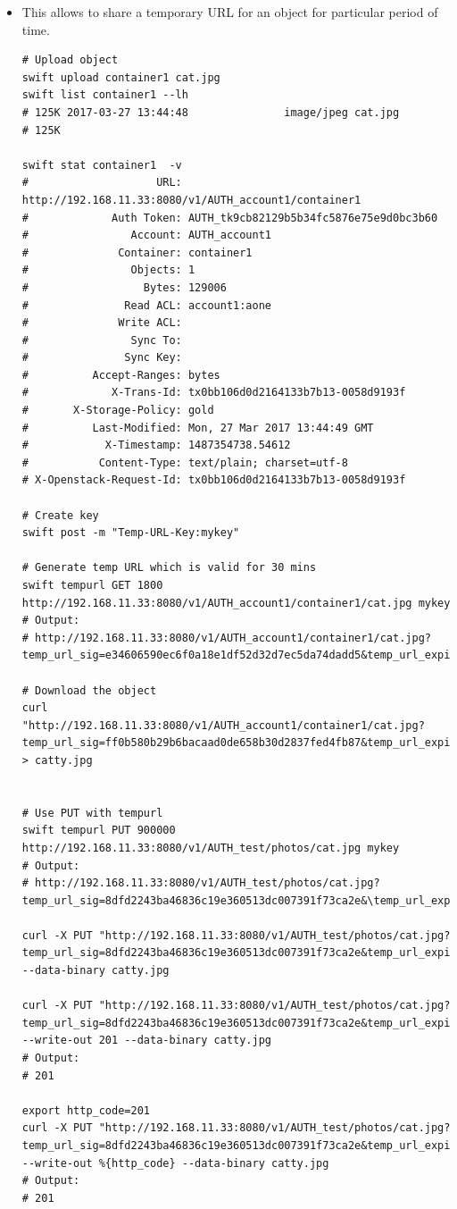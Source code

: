 \documentclass{article}
\begin{document}
\begin{itemize}
\item This allows to share a temporary URL for an object for particular
period of time.

\begin{verbatim}
# Upload object
swift upload container1 cat.jpg
swift list container1 --lh
# 125K 2017-03-27 13:44:48               image/jpeg cat.jpg
# 125K

swift stat container1  -v
#                    URL: http://192.168.11.33:8080/v1/AUTH_account1/container1
#             Auth Token: AUTH_tk9cb82129b5b34fc5876e75e9d0bc3b60
#                Account: AUTH_account1
#              Container: container1
#                Objects: 1
#                  Bytes: 129006
#               Read ACL: account1:aone
#              Write ACL:
#                Sync To:
#               Sync Key:
#          Accept-Ranges: bytes
#             X-Trans-Id: tx0bb106d0d2164133b7b13-0058d9193f
#       X-Storage-Policy: gold
#          Last-Modified: Mon, 27 Mar 2017 13:44:49 GMT
#            X-Timestamp: 1487354738.54612
#           Content-Type: text/plain; charset=utf-8
# X-Openstack-Request-Id: tx0bb106d0d2164133b7b13-0058d9193f

# Create key
swift post -m "Temp-URL-Key:mykey"

# Generate temp URL which is valid for 30 mins
swift tempurl GET 1800 http://192.168.11.33:8080/v1/AUTH_account1/container1/cat.jpg mykey
# Output:
# http://192.168.11.33:8080/v1/AUTH_account1/container1/cat.jpg?temp_url_sig=e34606590ec6f0a18e1df52d32d7ec5da74dadd5&temp_url_expires=1490624622

# Download the object
curl "http://192.168.11.33:8080/v1/AUTH_account1/container1/cat.jpg?temp_url_sig=ff0b580b29b6bacaad0de658b30d2837fed4fb87&temp_url_expires=1490624309" > catty.jpg


# Use PUT with tempurl
swift tempurl PUT 900000 http://192.168.11.33:8080/v1/AUTH_test/photos/cat.jpg mykey
# Output:
# http://192.168.11.33:8080/v1/AUTH_test/photos/cat.jpg?temp_url_sig=8dfd2243ba46836c19e360513dc007391f73ca2e&\temp_url_expires=1502741120

curl -X PUT "http://192.168.11.33:8080/v1/AUTH_test/photos/cat.jpg?temp_url_sig=8dfd2243ba46836c19e360513dc007391f73ca2e&temp_url_expires=1502741120" --data-binary catty.jpg

curl -X PUT "http://192.168.11.33:8080/v1/AUTH_test/photos/cat.jpg?temp_url_sig=8dfd2243ba46836c19e360513dc007391f73ca2e&temp_url_expires=1502741120" --write-out 201 --data-binary catty.jpg
# Output:
# 201

export http_code=201
curl -X PUT "http://192.168.11.33:8080/v1/AUTH_test/photos/cat.jpg?temp_url_sig=8dfd2243ba46836c19e360513dc007391f73ca2e&temp_url_expires=1502741120" --write-out %{http_code} --data-binary catty.jpg
# Output:
# 201
\end{verbatim}
\end{itemize}
\end{document}
